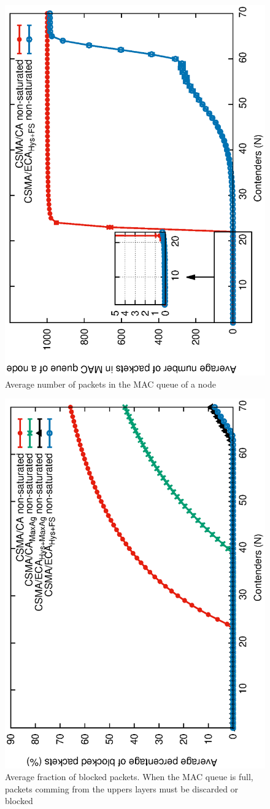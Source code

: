 	 \begin{figure}[tb]
		\centering				
		\includegraphics[width=0.7\linewidth,angle=-90]{figures/unsaturated/queueSize/queueSize-multiplot-TON.eps}
		\caption{Average number of packets in the MAC queue of a node}
		\label{fig:MacQ}
	\end{figure}
	
	\begin{figure}[tb]
		\centering
		\includegraphics[width=0.7\linewidth,angle=-90]{figures/unsaturated/blockingProb-unsat/blocking-unsaturated-TON.eps}
		\caption{Average fraction of blocked packets. When the MAC queue is full, packets comming from the uppers layers must be discarded or blocked}
		\label{fig:blocked-packets}
	\end{figure}
	
